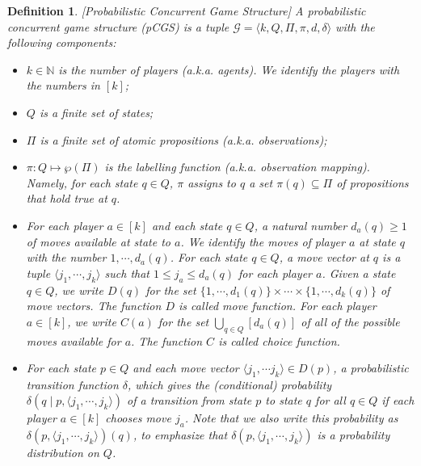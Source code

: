 \documentclass[times, 10 pt,twocolumn]{article}
\newtheorem{definition}[theorem]{Definition}{\bfseries}{\rm}
\newcommand{\mb}[1]{\mathbb{#1}}
\newcommand{\mc}[1]{\mathcal{#1}}
\newcommand{\la}{\langle}
\newcommand{\ra}{\rangle}
\begin{document}
\begin{definition}\label{pcgs}[Probabilistic Concurrent Game Structure] A
\emph{probabilistic concurrent game structure} (pCGS) is a tuple
$\mc{G}=\langle k, Q, \Pi, \pi, d, \delta\rangle$ with the
following components:
\begin{itemize}
  \item $k\in \mb{N}$ is the number of \emph{players} (a.k.a. \emph{agents}).
  We identify the players with the numbers in $[k]$;

  \item $Q$ is a finite set of \emph{states};

  \item $\Pi$ is a finite set of \emph{atomic propositions}
  (a.k.a. \emph{observations});

  \item $\pi: Q\mapsto \wp(\Pi)$ is the \emph{labelling function} (a.k.a. \emph{observation mapping}).
  Namely, for each state $q\in Q$, $\pi$ assigns to $q$ a set $\pi(q)\subseteq \Pi$ of
  propositions that hold true at $q$.

  \item For each player $a\in [k]$ and each state $q\in
  Q$, a natural number $d_a(q)\geq 1$ of \emph{moves} available at state
  to $a$. We identify the moves of player $a$ at state $q$
  with the number $1,\cdots, d_a(q)$. For each state $q\in Q$, a
  \emph{move vector} at $q$ is a tuple $\la j_1, \cdots, j_k\ra $ such that
  $1\leq j_a\leq d_a(q)$ for each player $a$. Given a state $q\in
  Q$, we write $D(q)$ for the set $\{1,\cdots, d_1(q)\} \times
  \cdots\times \{1,\cdots, d_k(q)\}$ of move vectors. The function
  $D$ is called \emph{move function}. For each player $a\in [k]$,
  we write $C(a)$ for the set $\bigcup_{q\in Q}[d_a(q)]$ of all of the
  possible moves available for $a$. The function $C$ is called \emph{choice function}.

  \item For each state $p\in Q$ and each move vector $\la j_1, \cdots
  j_k\ra\in D(p)$, a \emph{probabilistic transition function} $\delta$, which gives
  the (conditional) probability $\delta(q \mid p, \la j_1, \cdots, j_k\ra)$ of a transition from
  state $p$ to state $q$ for all $q\in Q$ if each player $a\in [k]$ chooses
  move $j_a$. Note that %
  we also write this probability as $\delta(p, \la j_1, \cdots, j_k\ra)(q)$, to emphasize that
  $\delta(p, \la j_1, \cdots, j_k\ra)$ is a probability distribution on $Q$.
\end{itemize}
\end{definition}
\end{document}
